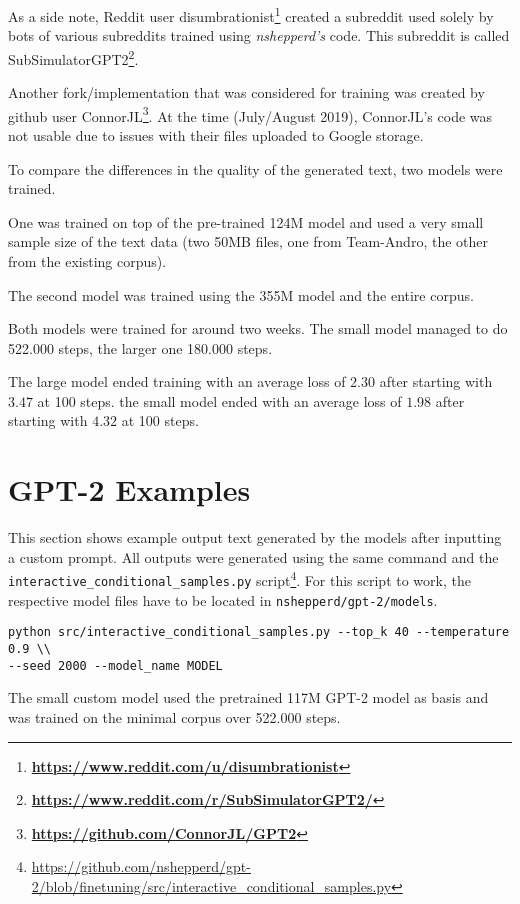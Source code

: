 \documentclass{scrartcl}
\newcommand{\burl}[1]{\textbf{\url{#1}}}
\begin{document}
As a side note, Reddit user disumbrationist\footnote{\burl{https://www.reddit.com/u/disumbrationist}} created a subreddit used solely by bots of various subreddits trained using \textit{nshepperd's} code. This subreddit is called SubSimulatorGPT2\footnote{\burl{https://www.reddit.com/r/SubSimulatorGPT2/}}.

Another fork/implementation that was considered for training was created by github user ConnorJL\footnote{\burl{https://github.com/ConnorJL/GPT2}}. At the time (July/August 2019), ConnorJL's code was not usable due to issues with their files uploaded to Google storage.

To compare the differences in the quality of the generated text, two models were trained.

One was trained on top of the pre-trained 124M model and used a very small sample size of the text data (two 50MB files, one from Team-Andro, the other from the existing corpus).

The second model was trained using the 355M model and the entire corpus. 

Both models were trained for around two weeks. The small model managed to do 522.000 steps, the larger one 180.000 steps.

The large model ended training with an average loss of $ 2.30 $ after starting with $ 3.47 $ at 100 steps.
the small model ended with an average loss of $ 1.98 $ after starting with $ 4.32 $ at 100 steps.


\section{GPT-2 Examples}

This section shows example output text generated by the models after inputting a custom prompt. All outputs were generated using the same command and the \\ \texttt{interactive\_conditional\_samples.py} script\footnote{\url{https://github.com/nshepperd/gpt-2/blob/finetuning/src/interactive_conditional_samples.py}}.
For this script to work, the respective model files have to be located in \texttt{nshepperd/gpt-2/models}.
\begin{verbatim}
python src/interactive_conditional_samples.py --top_k 40 --temperature 0.9 \\
--seed 2000 --model_name MODEL
\end{verbatim}

The small custom model used the pretrained 117M GPT-2 model as basis and was trained on the minimal corpus over 522.000 steps.
\end{document}
